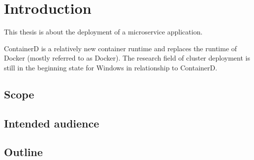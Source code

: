 
\chapter{Introduction} %

\label{chap:introd} %









This thesis is about the deployment of a microservice application.


ContainerD is a relatively new container runtime and replaces the runtime of Docker (mostly referred to as Docker).
The research field of cluster deployment is still in the beginning state for \ac{Windows} in relationship to ContainerD.




\section{Scope}
\section{Intended audience}


\section{Outline}

